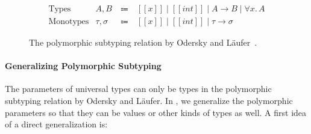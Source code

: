 \begin{figure}
\centering
\begin{equation*}
\begin{array}{llcl}
  \text{Types} & A, B & ~\Coloneqq~ & [[x]] \mid [[int]] \mid A \rightarrow B \mid \forall x.\, A \\
  \text{Monotypes} & \tau, \sigma & ~\Coloneqq~ & [[x]] \mid [[int]] \mid \tau \rightarrow \sigma
\end{array}
\end{equation*}

\caption{The polymorphic subtyping relation by Odersky and L\"aufer~\cite{odersky1996putting}.}
\label{fig:polymorphic-subtyping}
\end{figure}

\paragraph{Generalizing Polymorphic Subtyping}
\label{sec:polymorphic-subtyping}

The parameters of universal types can only be types in the polymorphic
subtyping relation by Odersky and L\"aufer.
In \name, we generalize the polymorphic parameters so that they can
be values or other kinds of types as well.
A first idea of a direct generalization is:



